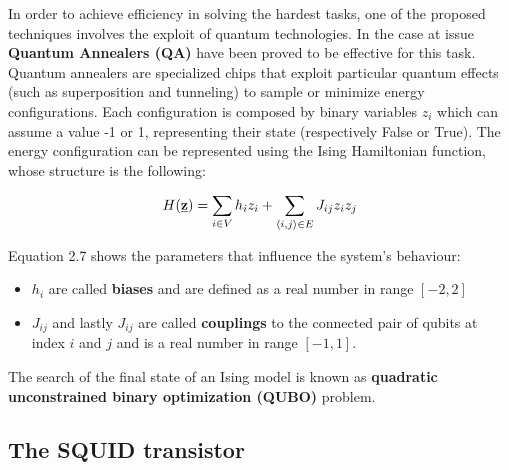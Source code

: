 In order to achieve efficiency in solving the hardest tasks, one of the proposed techniques involves the exploit of quantum technologies. In the case at issue \textbf{Quantum Annealers (QA)} have been proved to be effective for this task. \\
Quantum annealers are specialized chips that exploit particular quantum effects (such as superposition and tunneling) to sample or minimize energy configurations. Each configuration is composed by binary variables $z_i$ which can assume a value -1 or 1, representing their state (respectively False or True). The energy configuration can be represented using the Ising Hamiltonian function, whose structure is the following:

\begin{equation}
    H(\textbf{\underline{z}}) = \sum_{i \in V} h_iz_i + \sum_{\langle i,j\rangle \in E} J_{ij} z_iz_j
\end{equation}

Equation 2.7 shows the parameters that influence the system's behaviour: 

\begin{itemize}
    \item $h_i$ are called \textbf{biases} and are defined as a real number in range $[-2,2]$
    \item $J_{ij}$ and lastly $J_{ij}$ are called \textbf{couplings} to the connected pair of qubits at index $i$ and $j$ and is a real number in range $[-1,1]$.
\end{itemize}

The search of the final state of an Ising model is known as \textbf{quadratic unconstrained binary optimization (QUBO)} problem. \\

\subsection{The SQUID transistor}

